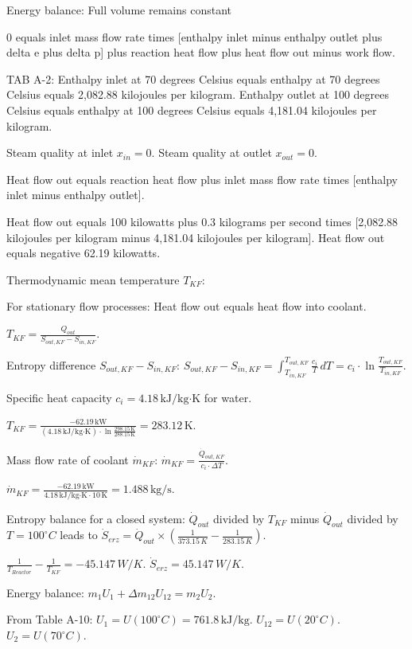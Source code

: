 Energy balance: Full volume remains constant  

0 equals inlet mass flow rate times [enthalpy inlet minus enthalpy outlet plus delta e plus delta p] plus reaction heat flow plus heat flow out minus work flow.  

TAB A-2:  
Enthalpy inlet at 70 degrees Celsius equals enthalpy at 70 degrees Celsius equals 2,082.88 kilojoules per kilogram.  
Enthalpy outlet at 100 degrees Celsius equals enthalpy at 100 degrees Celsius equals 4,181.04 kilojoules per kilogram.  

Steam quality at inlet \( x_{in} = 0 \).  
Steam quality at outlet \( x_{out} = 0 \).  

Heat flow out equals reaction heat flow plus inlet mass flow rate times [enthalpy inlet minus enthalpy outlet].  

Heat flow out equals 100 kilowatts plus 0.3 kilograms per second times [2,082.88 kilojoules per kilogram minus 4,181.04 kilojoules per kilogram].  
Heat flow out equals negative 62.19 kilowatts.  

Thermodynamic mean temperature \( T_{KF} \):  

For stationary flow processes:  
Heat flow out equals heat flow into coolant.  

\( T_{KF} = \frac{Q_{out}}{S_{out,KF} - S_{in,KF}} \).  

Entropy difference \( S_{out,KF} - S_{in,KF} \):  
\( S_{out,KF} - S_{in,KF} = \int_{T_{in,KF}}^{T_{out,KF}} \frac{c_i}{T} \, dT = c_i \cdot \ln \frac{T_{out,KF}}{T_{in,KF}} \).  

Specific heat capacity \( c_i = 4.18 \, \text{kJ/kg·K} \) for water.  

\( T_{KF} = \frac{-62.19 \, \text{kW}}{(4.18 \, \text{kJ/kg·K}) \cdot \ln \frac{298.15 \, \text{K}}{288.15 \, \text{K}}} = 283.12 \, \text{K} \).  

Mass flow rate of coolant \( \dot{m}_{KF} \):  
\( \dot{m}_{KF} = \frac{\dot{Q}_{out,KF}}{c_i \cdot \Delta T} \).  

\( \dot{m}_{KF} = \frac{-62.19 \, \text{kW}}{4.18 \, \text{kJ/kg·K} \cdot 10 \, \text{K}} = 1.488 \, \text{kg/s} \).

Entropy balance for a closed system:  
\( \dot{Q}_{out} \) divided by \( T_{KF} \) minus \( \dot{Q}_{out} \) divided by \( T = 100^\circ C \) leads to \( \dot{S}_{erz} = \dot{Q}_{out} \times \left( \frac{1}{373.15 \, K} - \frac{1}{283.15 \, K} \right) \).  

\( \frac{1}{T_{Reactor}} - \frac{1}{T_{KF}} = -45.147 \, W/K \).  
\( \dot{S}_{erz} = 45.147 \, W/K \).  

Energy balance:  
\( m_1 U_1 + \Delta m_{12} U_{12} = m_2 U_2 \).  

From Table A-10:  
\( U_1 = U(100^\circ C) = 761.8 \, \text{kJ/kg} \).  
\( U_{12} = U(20^\circ C) \).  
\( U_2 = U(70^\circ C) \).